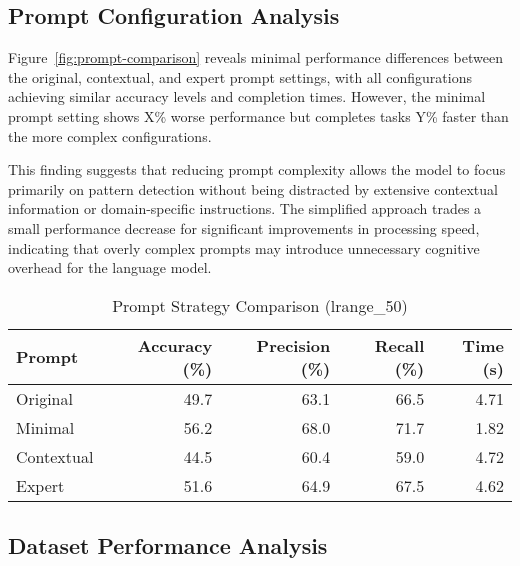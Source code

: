 \documentclass[sigconf,authorversion,nonacm]{acmart}
\begin{document}
\subsection{Prompt Configuration Analysis}


Figure~\ref{fig:prompt-comparison} reveals minimal performance differences between the original, contextual, and expert prompt settings, with all configurations achieving similar accuracy levels and completion times. However, the minimal prompt setting shows X\% worse performance but completes tasks Y\% faster than the more complex configurations.

This finding suggests that reducing prompt complexity allows the model to focus primarily on pattern detection without being distracted by extensive contextual information or domain-specific instructions. The simplified approach trades a small performance decrease for significant improvements in processing speed, indicating that overly complex prompts may introduce unnecessary cognitive overhead for the language model.

\begin{table}[!htbp]
\centering
\caption{Prompt Strategy Comparison (lrange\_50)}
\small
\label{tab:prompt-strategy-comparison}
\begin{tabular}{@{}lrrrr@{}}
\toprule
\textbf{Prompt} & \textbf{Accuracy (\%)} & \textbf{Precision (\%)} & \textbf{Recall (\%)} & \textbf{Time (s)} \\
\midrule
Original & 49.7 & 63.1 & 66.5 & 4.71 \\
Minimal & 56.2 & 68.0 & 71.7 & 1.82 \\
Contextual & 44.5 & 60.4 & 59.0 & 4.72 \\
Expert & 51.6 & 64.9 & 67.5 & 4.62 \\
\bottomrule
\end{tabular}
\end{table}


\subsection{Dataset Performance Analysis}
\end{document}
